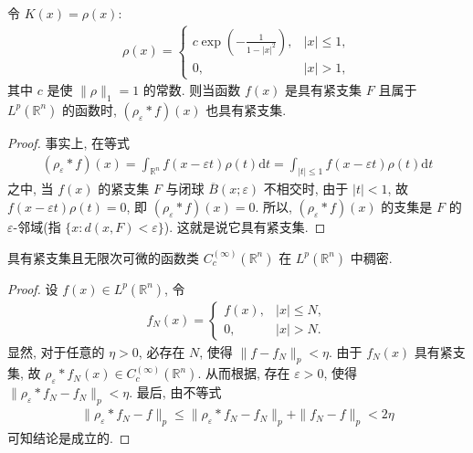 \documentclass[../../main.tex]{subfiles}%
\begin{document}
\begin{proposition}
令 $K(x)=\rho(x)$:
\begin{align*}
\rho(x) = 
\begin{cases}
c\exp\left( -\frac{1}{1-|x|^2} \right), & |x|\leqslant 1, \\
0, & |x|>1,
\end{cases}
\end{align*}
其中 $c$ 是使 $\|\rho\|_1=1$ 的常数. 则当函数 $f(x)$ 是具有紧支集 $F$ 且属于 $L^p(\mathbb{R}^n)$ 的函数时, $(\rho_\varepsilon * f)(x)$ 也具有紧支集.
\end{proposition}
\begin{proof}

事实上, 在等式
\begin{align*}
(\rho_\varepsilon * f)(x) = \int_{\mathbb{R}^n} f(x-\varepsilon t) \rho(t) \mathrm{d}t = \int_{|t|\leqslant 1} f(x-\varepsilon t) \rho(t) \mathrm{d}t
\end{align*}
之中, 当 $f(x)$ 的紧支集 $F$ 与闭球 $\overline{B}(x;\varepsilon)$ 不相交时, 由于 $|t|<1$, 故 $f(x-\varepsilon t)\rho(t)=0$, 即 $(\rho_\varepsilon * f)(x)=0$. 所以, $(\rho_\varepsilon * f)(x)$ 的支集是 $F$ 的 $\varepsilon$-邻域(指 $\{x: d(x,F)<\varepsilon\}$). 这就是说它具有紧支集.
\end{proof}

\begin{theorem}
具有紧支集且无限次可微的函数类 $C_c^{(\infty)}(\mathbb{R}^n)$ 在 $L^p(\mathbb{R}^n)$ 中稠密.
\end{theorem}
\begin{proof}

设 $f(x)\in L^p(\mathbb{R}^n)$, 令
\begin{align*}
f_N(x) = 
\begin{cases}
f(x), & |x|\leqslant N, \\
0, & |x|>N.
\end{cases}
\end{align*}
显然, 对于任意的 $\eta>0$, 必存在 $N$, 使得 $\|f-f_N\|_p<\eta$. 由于 $f_N(x)$ 具有紧支集, 故 $\rho_\varepsilon * f_N(x)\in C_c^{(\infty)}(\mathbb{R}^n)$. 从而根据, 存在 $\varepsilon>0$, 使得 $\|\rho_\varepsilon * f_N - f_N\|_p < \eta$. 最后, 由不等式
\begin{align*}
\|\rho_\varepsilon * f_N - f\|_p \leqslant \|\rho_\varepsilon * f_N - f_N\|_p + \|f_N - f\|_p < 2\eta
\end{align*}
可知结论是成立的.

\end{proof}
\end{document}

